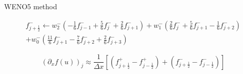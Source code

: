 \documentclass{beamer}
\newcommand{\backupend}{
   \setcounter{framenumber}{\value{finalframe}}
}
\begin{document}
\begin{frame}{WENO5 method}
{    $$
      \begin{aligned}
        f_{j+\frac{1}{2}}^- \gets w_2^- \left(-\frac{1}{6}f^-_{j-1} + \frac{5}{6}f^-_{j}   + \frac{2}{6}f^-_{j+1}\right)
                                + w_1^- \left( \frac{2}{6}f^-_{j}   + \frac{5}{6}f^-_{j+1} - \frac{1}{6}f^-_{j+2}\right) \\
                                + w_0^- \left(\frac{11}{6}f^-_{j+1} - \frac{7}{6}f^-_{j+2} + \frac{2}{6}f^-_{j+3}\right)
      \end{aligned}
    $$

    $$
    \boxed{
      (\partial_x f(u))_j \approx \frac{1}{\Delta x}\left[(f_{j+\frac{1}{2}}^+ - f_{j-\frac{1}{2}}^+) + (f_{j+\frac{1}{2}}^- - f_{j-\frac{1}{2}}^-)\right]
      }
    $$
  }
\end{frame}

\backupend
\end{document}

